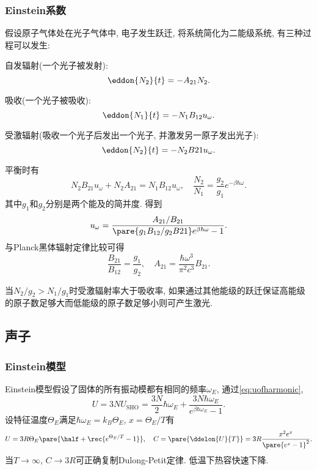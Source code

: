 \documentclass[../Thermal.tex]{subfiles}
\begin{document}
\subsubsection{Einstein系数}
假设原子气体处在光子气体中, 电子发生跃迁, 将系统简化为二能级系统, 有三种过程可以发生:
\begin{cenum}
\item 自发辐射(一个光子被发射):
\[ \eddon{N_2}{t} = -A_{21}N_2. \]
\item 吸收(一个光子被吸收):
\[ \eddon{N_1}{t} = -N_1 B_{12}u_{\omega}. \]
\item 受激辐射(吸收一个光子后发出一个光子, 并激发另一原子发出光子):
\[ \eddon{N_2}{t} = -N_2B{21}u_{\omega}. \]
\end{cenum}
平衡时有
\[ N_2B_{21}u_{\omega} + N_2A_{21} = N_1B_{12}u_{\omega},\quad \frac{N_2}{N_1} = \frac{g_2}{g_1}e^{-\beta \hbar \omega}. \]
其中$g_1$和$g_2$分别是两个能及的简并度. 得到
\[ u_{\omega} = \frac{A_{21}/B_{21}}{\pare{g_1B_{12}/g_2B{21}}e^{\beta\hbar\omega} - 1}. \]
与Planck黑体辐射定律比较可得
\[ \frac{B_{21}}{B_{12}} = \frac{g_1}{g_2},\quad A_{21} = \frac{\hbar\omega^3}{\pi^2c^3}B_{21}. \]
\begin{ex}
当$N_2/g_2>N_1/g_1$时受激辐射率大于吸收率, 如果通过其他能级的跃迁保证高能级的原子数足够大而低能级的原子数足够小则可产生激光.
\end{ex}
\subsection{声子}
\subsubsection{Einstein模型}
Einstein模型假设了固体的所有振动模都有相同的频率$\omega_E$, 通过\eqref{eq:uofharmonic},
\[ U = 3NU_{\mathrm{SHO}} = \frac{3N}{2}\hbar\omega_E + \frac{3N\hbar\omega_E}{e^{\beta\hbar\omega_E} - 1}. \]
设特征温度$\Theta_E$满足$\hbar\omega_E = k_B\Theta_E$, $x=\Theta_E/T$有
\[ U = 3R\Theta_E \pare{\half + \rec{e^{\Theta_E/T} - 1}},\quad C = \pare{\ddelon{U}{T}} = 3R\frac{x^2e^x}{\pare{e^x-1}^2}. \]
当$T\rightarrow\infty$, $C\rightarrow 3R$可正确复制Dulong-Petit定律. 低温下热容快速下降.
\end{document}

